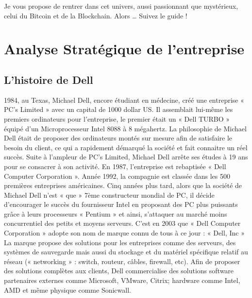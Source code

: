 \documentclass{bredele} %
\begin{document}
    Je vous propose de rentrer dans cet univers, aussi passionnant que mystérieux, celui du Bitcoin et de la Blockchain. Alors … Suivez le guide !
    \tableofcontents
    \clearemptydoublepage
    \part{Analyse Stratégique de l'entreprise}
        \chapter{L'histoire de Dell}
        1984, au Texas, Michael Dell, encore étudiant en médecine, créé une entreprise « PC’s Limited » avec un capital de 1000 dollar US. Il assemblait lui-même les premiers ordinateurs pour l’entreprise, le premier était un « Dell TURBO » équipé d’un Microprocesseur Intel 8088 à 8 mégahertz.
        La philosophie de Michael Dell était de proposer des ordinateurs montés sur mesure afin de satisfaire le besoin du client, ce qui a rapidement démarqué la société et fait connaitre un réel succès.
        Suite à l’ampleur de PC’s Limited, Michael Dell arrête ses études à 19 ans pour se consacrer à son activité. En 1987, l’entreprise est rebaptisée « Dell Computer Corporation ».
        \newline
        \newline
        Année 1992, la compagnie est classée dans les 500 premières entreprises américaines. Cinq années plus tard, alors que la société de Michael Dell n’est « que » 7ème constructeur mondial de PC, il décide d’encourager le succès du fournisseur Intel en proposant des PC plus puissants grâce à leurs processeurs « Pentium » et ainsi, s’attaquer au marché moins concurrentiel des petits et moyens serveurs.
        C’est en 2003 que « Dell Computer Corporation » adopte son nom de marque connu de tous à ce jour : « Dell, Inc »
        \newline
        \newline
        La marque propose des solutions pour les entreprises comme des serveurs, des systèmes de sauvegarde mais aussi du stockage et du matériel spécifique relatif au réseau (« networking » : switch, routeur, câbles, firewall, etc).
        Afin de proposer des solutions complètes aux clients, Dell commercialise des solutions software partenaires externes comme Microsoft, VMware, Citrix; hardware comme Intel, AMD et même physique comme Sonicwall.
        \newline
        \newline
\end{document}
